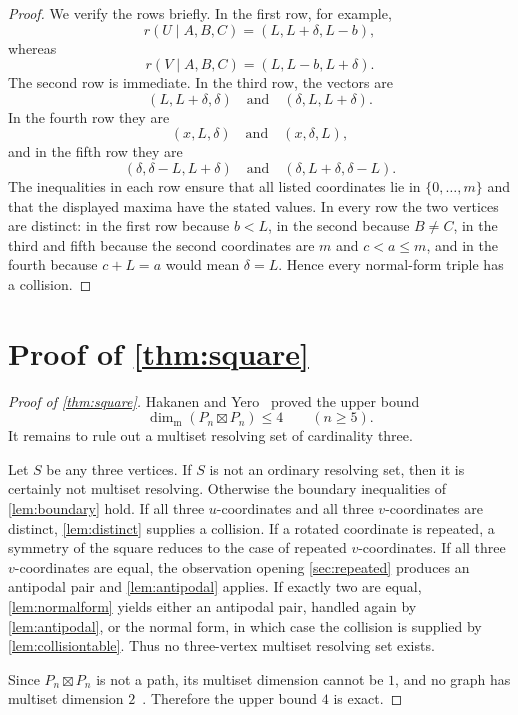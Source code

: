 \documentclass[11pt]{amsart}
\theoremstyle{remark}
\newcommand{\mdim}{\operatorname{dim}_{\mathrm m}}
\begin{document}
\begin{proof}
We verify the rows briefly.  In the first row, for example,
\[
 r(U\mid A,B,C)=(L,L+\delta,L-b),
\]
whereas
\[
 r(V\mid A,B,C)=(L,L-b,L+\delta).
\]
The second row is immediate.  In the third row, the vectors are
\[
 (L,L+\delta,\delta)
 \quad\text{and}\quad
 (\delta,L,L+\delta).
\]
In the fourth row they are
\[
 (x,L,\delta)
 \quad\text{and}\quad
 (x,\delta,L),
\]
and in the fifth row they are
\[
 (\delta,\delta-L,L+\delta)
 \quad\text{and}\quad
 (\delta,L+\delta,\delta-L).
\]
The inequalities in each row ensure that all listed coordinates lie in $\{0,\dots,m\}$ and that the displayed maxima have the stated values.  In every row the two vertices are distinct: in the first row because $b<L$, in the second because $B\ne C$, in the third and fifth because the second coordinates are $m$ and $c<a\le m$, and in the fourth because $c+L=a$ would mean $\delta=L$.  Hence every normal-form triple has a collision.
\end{proof}

\section{Proof of \texorpdfstring{\cref{thm:square}}{the square king grid theorem}}\label{sec:proofsquare}

\begin{proof}[Proof of \cref{thm:square}]
Hakanen and Yero~\cite[Proposition~4.2 and Theorem~4.3]{HakanenYero2024} proved the upper bound
\[
 \mdim(P_n\boxtimes P_n)\le4
 \qquad (n\ge5).
\]
It remains to rule out a multiset resolving set of cardinality three.

Let $S$ be any three vertices.  If $S$ is not an ordinary resolving set, then it is certainly not multiset resolving.  Otherwise the boundary inequalities of \cref{lem:boundary} hold.  If all three $u$-coordinates and all three $v$-coordinates are distinct, \cref{lem:distinct} supplies a collision.  If a rotated coordinate is repeated, a symmetry of the square reduces to the case of repeated $v$-coordinates.  If all three $v$-coordinates are equal, the observation opening \cref{sec:repeated} produces an antipodal pair and \cref{lem:antipodal} applies.  If exactly two are equal, \cref{lem:normalform} yields either an antipodal pair, handled again by \cref{lem:antipodal}, or the normal form, in which case the collision is supplied by \cref{lem:collisiontable}.  Thus no three-vertex multiset resolving set exists.

Since $P_n\boxtimes P_n$ is not a path, its multiset dimension cannot be $1$, and no graph has multiset dimension $2$~\cite{SimanjuntakEtAl}.  Therefore the upper bound $4$ is exact.
\end{proof}
\end{document}
